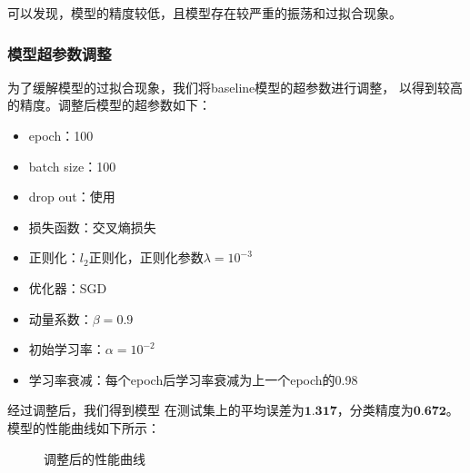 \documentclass[UTF8]{ctexart}
\begin{document}
可以发现，模型的精度较低，且模型存在较严重的振荡和过拟合现象。

\subsubsection{模型超参数调整}
为了缓解模型的过拟合现象，我们将baseline模型的超参数进行调整，
以得到较高的精度。调整后模型的超参数如下：
\begin{itemize}
    \item epoch：100
    \item batch size：100
    \item drop out：使用
    \item 损失函数：交叉熵损失
    \item 正则化：$l_2$正则化，正则化参数$\lambda=10^{-3}$
    \item 优化器：SGD
    \item 动量系数：$\beta=0.9$
    \item 初始学习率：$\alpha=10^{-2}$
    \item 学习率衰减：每个epoch后学习率衰减为上一个epoch的0.98
\end{itemize}

经过调整后，我们得到模型
在测试集上的平均误差为$\textbf{1.317}$，分类精度为$\textbf{0.672}$。
模型的性能曲线如下所示：

\begin{figure}[htbp]
    \centering
    \hspace{0.5in}
    \caption{调整后的性能曲线}
\end{figure}
\end{document}
